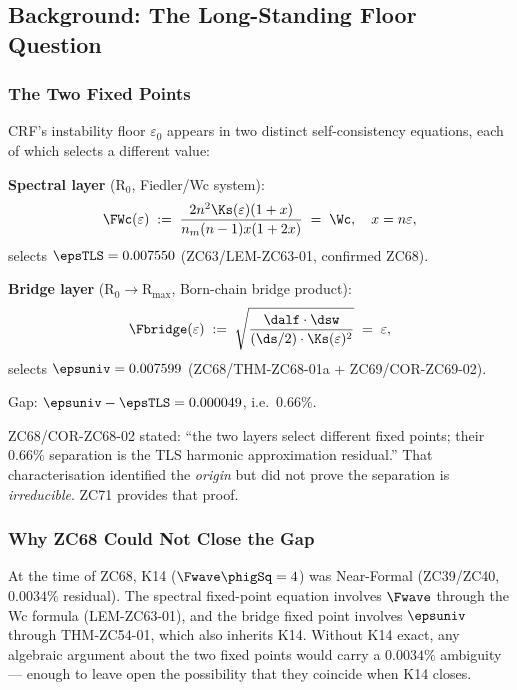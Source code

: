 \documentclass[12pt, a4paper]{article}
\begin{document}
\tableofcontents

\newpage

\subsection{Background: The Long-Standing Floor Question}
\label{sec:background}

\subsubsection{The Two Fixed Points}

CRF's instability floor $\varepsilon_0$ appears in two
distinct self-consistency equations, each of which selects
a different value:

\begin{keybox}[title={The Two Self-Consistency Layers (Summary from ZC68)}]
\textbf{Spectral layer} (R$_0$, Fiedler/Wc system):
\[
  \FWc(\varepsilon)\;:=\;\frac{2n^2\Ks(\varepsilon)(1+x)}{n_m(n-1)x(1+2x)}
  \;=\; \Wc,\quad x = n\varepsilon,
\]
selects $\epsTLS = 0.007550$ (ZC63/LEM-ZC63-01, confirmed ZC68).

\medskip
\textbf{Bridge layer} (R$_0\to$R$_{\max}$, Born-chain bridge product):
\[
  \Fbridge(\varepsilon)\;:=\;\sqrt{\frac{\dalf\cdot\dsw}{(\ds/2)\cdot\Ks(\varepsilon)^2}}
  \;=\;\varepsilon,
\]
selects $\epsuniv = 0.007599$ (ZC68/THM-ZC68-01a + ZC69/COR-ZC69-02).

\medskip
Gap: $\epsuniv - \epsTLS = 0.000049$, i.e.\ $0.66\%$.

ZC68/COR-ZC68-02 stated: ``the two layers select different fixed points;
their $0.66\%$ separation is the TLS harmonic approximation residual.''
That characterisation identified the \emph{origin} but did not prove
the separation is \emph{irreducible}.
ZC71 provides that proof.
\end{keybox}

\subsubsection{Why ZC68 Could Not Close the Gap}

At the time of ZC68, K14 ($\Fwave\phigSq = 4$) was Near-Formal
(ZC39/ZC40, $0.0034\%$ residual).
The spectral fixed-point equation involves $\Fwave$ through
the Wc formula (LEM-ZC63-01), and the bridge fixed point
involves $\epsuniv$ through THM-ZC54-01, which also inherits K14.
Without K14 exact, any algebraic argument about the two
fixed points would carry a $0.0034\%$ ambiguity --- enough to
leave open the possibility that they coincide when K14 closes.
\end{document}
